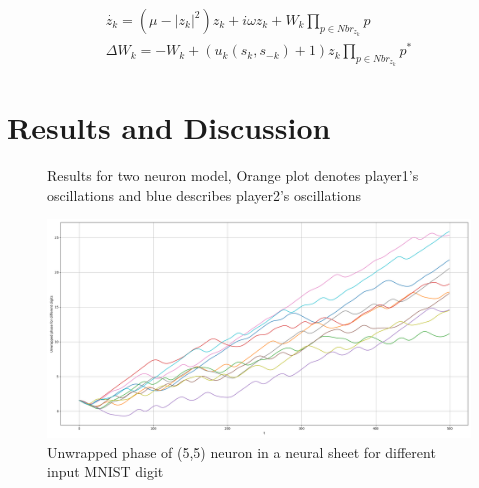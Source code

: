 \documentclass{article}
\begin{document}
\begin{subequations}
\label{eqn: multi_neuron}
\begin{align}
 \dot{z_k} = (\mu - |z_k|^2)z_k + i\omega z_k + W_k \prod_{p \in Nbr_{z_k}} p \\ 
 \Delta W_k = - W_k + (u_k(s_k, s_{-k}) + 1)z_k \prod_{p \in Nbr_{z_k}}p^*
\end{align}
\end{subequations}

\section{Results and Discussion}
\label{resdis}

\begin{figure}
    \centering
    \caption{Results for two neuron model, Orange plot denotes player1's oscillations and blue describes player2's oscillations}
    \label{fig: two_neuron_results}
\end{figure}

\begin{figure}
    \centering
    \includegraphics[width=1.\textwidth]{mnist_phase.png}
    \caption{Unwrapped phase of (5,5) neuron in a neural sheet for different input MNIST digit}
    \label{fig: mnist_phase}
\end{figure}
\end{document}
